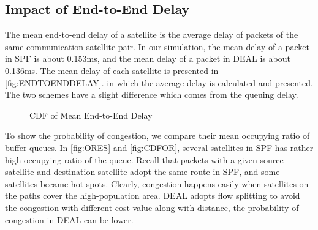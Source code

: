 \subsection{Impact of End-to-End Delay }

The mean end-to-end delay of a satellite is the average delay of packets of the same communication satellite pair. In our simulation, the mean delay of a packet in SPF is about 0.153ms, and the mean delay of a packet in DEAL is about 0.136ms. The mean delay of each satellite is presented in \ref{fig:ENDTOENDDELAY}. in which the average delay is calculated and presented.  The two schemes have a slight difference which comes from the queuing delay.

\begin{figure}[htp]
	\centering
	
	
\caption{CDF of Mean End-to-End Delay}
\label{fig:DELAY}
\end{figure}

To show the probability of congestion, we  compare their mean occupying ratio of buffer queues. In \ref{fig:ORES} and \ref{fig:CDFOR}, several satellites in SPF has rather high occupying ratio of the queue. Recall that packets with a given source satellite and destination satellite adopt the same route in SPF, and some satellites became hot-spots. Clearly, congestion happens easily when satellites on the paths cover the high-population area.  DEAL adopts flow splitting to avoid the congestion with different cost value along with distance, the probability of congestion in DEAL can be lower. 

